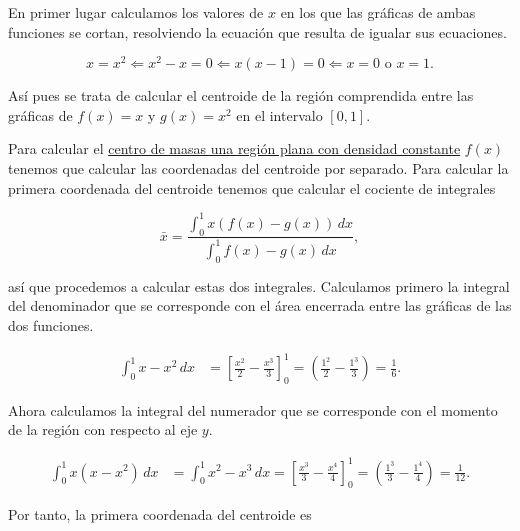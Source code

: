 \documentclass[
  spanish,
  a4paper,
]{scrreport}
\theoremstyle{definition}
\theoremstyle{remark}
\begin{document}
\begin{tcolorbox}[enhanced jigsaw, arc=.35mm, bottomrule=.15mm, bottomtitle=1mm, breakable, colback=white, colbacktitle=quarto-callout-tip-color!10!white, colframe=quarto-callout-tip-color-frame, coltitle=black, left=2mm, leftrule=.75mm, opacityback=0, opacitybacktitle=0.6, rightrule=.15mm, title=\textcolor{quarto-callout-tip-color}{\faLightbulb}\hspace{0.5em}{Solución}, titlerule=0mm, toprule=.15mm, toptitle=1mm]

En primer lugar calculamos los valores de \(x\) en los que las gráficas
de ambas funciones se cortan, resolviendo la ecuación que resulta de
igualar sus ecuaciones.

\[
x = x^2 \Leftarrow x^2-x = 0 \Leftarrow x(x-1) = 0 \Leftarrow x=0 \mbox{ o } x=1.
\]

Así pues se trata de calcular el centroide de la región comprendida
entre las gráficas de \(f(x)=x\) y \(g(x)=x^2\) en el intervalo
\([0,1]\).

Para calcular el
\href{https://aprendeconalf.es/analisis-manual/08-integrales.html\#centro-de-masas-de-una-regi\%C3\%B3n-plana-con-densidad-fija}{centro
de masas una región plana con densidad constante} \(f(x)\) tenemos que
calcular las coordenadas del centroide por separado. Para calcular la
primera coordenada del centroide tenemos que calcular el cociente de
integrales

\[
\bar x = \frac{\int_0^1 x (f(x)-g(x))\,dx}{\int_0^1f(x)-g(x)\,dx}, 
\]

así que procedemos a calcular estas dos integrales. Calculamos primero
la integral del denominador que se corresponde con el área encerrada
entre las gráficas de las dos funciones.

\begin{align*}
\int_0^1 x-x^2\,dx 
&= \left[\frac{x^2}{2}-\frac{x^3}{3}\right]_0^1
= \left(\frac{1^2}{2}-\frac{1^3}{3}\right)
= \frac{1}{6}.
\end{align*}

Ahora calculamos la integral del numerador que se corresponde con el
momento de la región con respecto al eje \(y\).

\begin{align*}
\int_0^1 x(x-x^2)\,dx 
&= \int_0^1 x^2-x^3\,dx
= \left[\frac{x^3}{3}-\frac{x^4}{4}\right]_0^1
= \left(\frac{1^3}{3}-\frac{1^4}{4}\right)
= \frac{1}{12}.
\end{align*}

Por tanto, la primera coordenada del centroide es


\end{tcolorbox}
\end{document}
